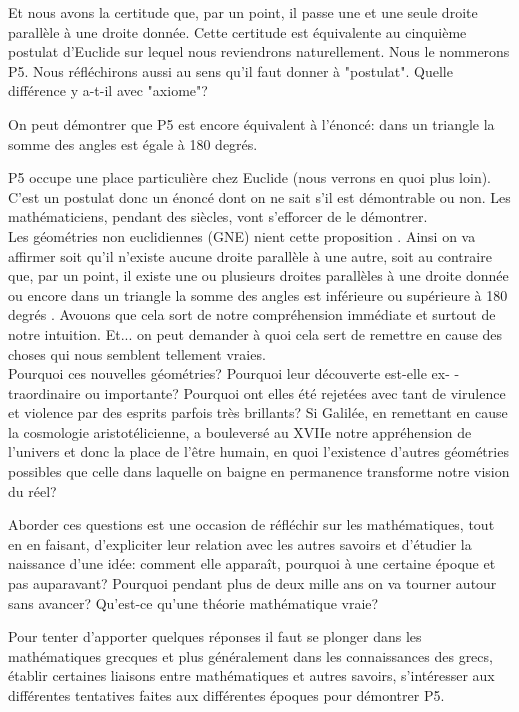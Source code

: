 \documentclass[a4paper, 12pt, twoside]{book}
\begin{document}
    Et nous avons la certitude que, par un point, il passe une et une  seule droite parallèle à une droite donnée. Cette certitude est équivalente au cinquième postulat d'Euclide sur lequel nous reviendrons naturellement. Nous le nommerons P5. Nous réfléchirons aussi au sens qu'il faut donner à "postulat". Quelle différence y a-t-il avec "axiome"? \
     
     
    On peut démontrer que P5 est encore équivalent à l'énoncé: dans un triangle la somme des angles est égale à 180 degrés.\
    
    P5 occupe une place particulière chez Euclide (nous verrons en quoi plus loin). C'est un postulat donc un énoncé dont on ne sait s'il est démontrable ou non. Les mathématiciens, pendant des siècles, vont s'efforcer de le démontrer.\\
    
       
    

  Les géométries non euclidiennes (GNE) nient cette proposition . Ainsi on va affirmer soit qu'il n'existe aucune droite parallèle à une autre, soit au contraire que, par un point, il  existe une ou plusieurs droites parallèles à une droite donnée ou encore dans un triangle la somme des angles est inférieure ou supérieure à 180 degrés . Avouons que cela sort de notre compréhension immédiate et surtout de notre intuition. Et... on peut demander à quoi cela sert  de remettre en cause des choses qui nous semblent tellement vraies. \\
  

  Pourquoi ces nouvelles géométries? Pourquoi leur découverte est-elle      ex- -traordinaire ou importante? Pourquoi ont elles été rejetées avec tant de virulence et violence par des esprits parfois très brillants? Si Galilée, en remettant en cause la cosmologie aristotélicienne, a bouleversé au XVIIe notre appréhension de l'univers et donc la place de l'être humain, en quoi l'existence d'autres géométries possibles que celle dans laquelle on baigne en permanence transforme notre vision du réel?\bigskip 

   Aborder ces questions est une occasion de réfléchir sur les mathématiques, tout en en faisant, d'expliciter leur relation avec les autres savoirs et d'étudier la naissance d'une idée: comment elle apparaît, pourquoi à une certaine époque et pas auparavant? Pourquoi pendant plus de deux mille ans on va tourner autour sans avancer? Qu'est-ce qu'une théorie mathématique vraie?
\bigskip 

   Pour tenter d'apporter quelques réponses il faut se plonger dans les mathématiques grecques et plus généralement dans les connaissances des grecs, établir certaines liaisons entre mathématiques et autres savoirs, s'intéresser aux différentes tentatives faites aux différentes époques pour démontrer P5.\bigskip 
   
\end{document}
